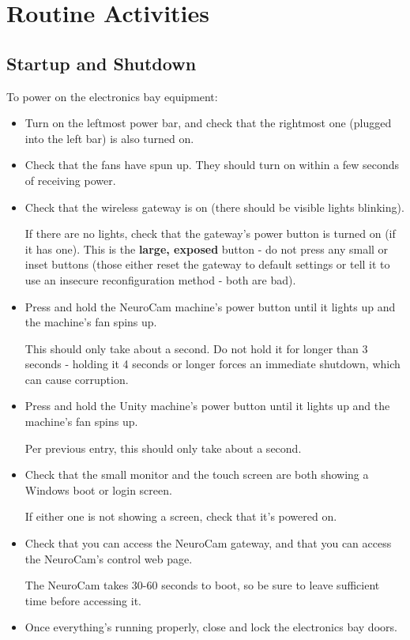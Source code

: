 
\chapter{Routine Activities}
\label{sect-routine}

\section{Startup and Shutdown}
\label{sect-routine-startupdown}

To power on the electronics bay equipment:

\begin{itemize}
%
\item Turn on the leftmost power bar, and check that the rightmost one
(plugged into the left bar) is also turned on.
%
\item Check that the fans have spun up. They should turn on within a few 
seconds of receiving power.
%
\item Check that the wireless gateway is on (there should be visible lights 
blinking).

If there are no lights, check that the gateway's power button is 
turned on (if it has one). This is the \textbf{large, exposed} button - do 
not press any small or inset buttons (those either reset the gateway to 
default settings or tell it to use an insecure reconfiguration method - 
both are bad).
%
\item Press and hold the NeuroCam machine's power button until it lights up
and the machine's fan spins up.

This should only take about a second. Do not hold it for longer than 3
seconds - holding it 4 seconds or longer forces an immediate shutdown, which
can cause corruption.
%
\item Press and hold the Unity machine's power button until it lights up and
the machine's fan spins up.

Per previous entry, this should only take about a second.
%
\item Check that the small monitor and the touch screen are both showing
a Windows boot or login screen.

If either one is not showing a screen, check that it's powered on.
%
\item Check that you can access the NeuroCam gateway, and that you can
access the NeuroCam's control web page.

The NeuroCam takes 30-60 seconds to boot, so be sure to leave sufficient
time before accessing it.
%
\item Once everything's running properly, close and lock the electronics 
bay doors.
%
\end{itemize}

